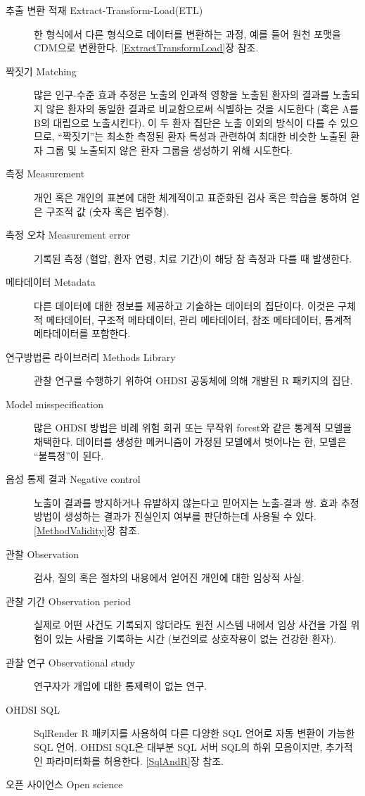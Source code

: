\documentclass[10.5pt]{book}
\theoremstyle{definition}
\theoremstyle{definition}
\theoremstyle{definition}
\theoremstyle{remark}
\begin{document}
\begin{description}
\item[추출 변환 적재 Extract-Transform-Load(ETL)]
한 형식에서 다른 형식으로 데이터를 변환하는 과정, 예를 들어 원천 포맷을
CDM으로 변환한다. \ref{ExtractTransformLoad}장 참조.
\item[짝짓기 Matching]
많은 인구-수준 효과 추정은 노출의 인과적 영향을 노출된 환자의 결과를
노출되지 않은 환자의 동일한 결과로 비교함으로써 식별하는 것을 시도한다
(혹은 A를 B의 대립으로 노출시킨다). 이 두 환자 집단은 노출 이외의 방식이
다를 수 있으므로, ``짝짓기''는 최소한 측정된 환자 특성과 관련하여 최대한
비슷한 노출된 환자 그룹 및 노출되지 않은 환자 그룹을 생성하기 위해
시도한다.
\item[측정 Measurement]
개인 혹은 개인의 표본에 대한 체계적이고 표준화된 검사 혹은 학습을 통하여
얻은 구조적 값 (숫자 혹은 범주형).
\item[측정 오차 Measurement error]
기록된 측정 (혈압, 환자 연령, 치료 기간)이 해당 참 측정과 다를 때
발생한다.
\item[메타데이터 Metadata]
다른 데이터에 대한 정보를 제공하고 기술하는 데이터의 집단이다. 이것은
구체적 메타데이터, 구조적 메타데이터, 관리 메타데이터, 참조 메타데이터,
통계적 메타데이터를 포함한다.
\item[연구방법론 라이브러리 Methods Library]
관찰 연구를 수행하기 위하여 OHDSI 공동체에 의해 개발된 R 패키지의 집단.
\item[Model misspecification]
많은 OHDSI 방법은 비례 위험 회귀 또는 무작위 forest와 같은 통계적 모델을
채택한다. 데이터를 생성한 메커니즘이 가정된 모델에서 벗어나는 한, 모델은
``불특정''이 된다.
\item[음성 통제 결과 Negative control]
노출이 결과를 방지하거나 유발하지 않는다고 믿어지는 노출-결과 쌍. 효과
추정 방법이 생성하는 결과가 진실인지 여부를 판단하는데 사용될 수 있다.
\ref{MethodValidity}장 참조.
\item[관찰 Observation]
검사, 질의 혹은 절차의 내용에서 얻어진 개인에 대한 임상적 사실.
\item[관찰 기간 Observation period]
실제로 어떤 사건도 기록되지 않더라도 원천 시스템 내에서 임상 사건을 가질
위험이 있는 사람을 기록하는 시간 (보건의료 상호작용이 없는 건강한 환자).
\item[관찰 연구 Observational study]
연구자가 개입에 대한 통제력이 없는 연구.
\item[OHDSI SQL]
SqlRender R 패키지를 사용하여 다른 다양한 SQL 언어로 자동 변환이 가능한
SQL 언어. OHDSI SQL은 대부분 SQL 서버 SQL의 하위 모음이지만, 추가적인
파라미터화를 허용한다. \ref{SqlAndR}장 참조.
\item[오픈 사이언스 Open science]

\end{description}
\end{document}
